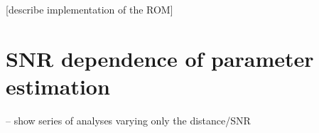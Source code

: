 \documentclass[aps,showpacs,twocolumn,prd,superscriptaddress,nofootinbib]{revtex4-1}
\begin{document}
[describe implementation of the ROM]


\section{SNR dependence of parameter estimation}
\label{sec:SMBHPEdistance}

-- show series of analyses varying only the distance/SNR



\end{document}
